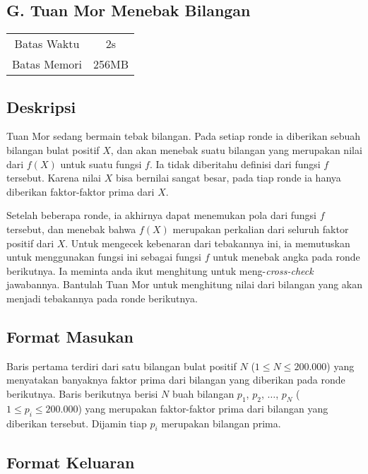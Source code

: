 \documentclass{article}
\begin{document}
\begin{center}
    \section*{G. Tuan Mor Menebak Bilangan}

    \begin{tabular}{ | c c | }
        \hline
        Batas Waktu  & 2s \\ 
        Batas Memori & 256MB \\ 
        \hline
    \end{tabular}
\end{center}

\subsection*{Deskripsi}

Tuan Mor sedang bermain tebak bilangan. Pada setiap ronde ia diberikan sebuah bilangan bulat positif $X$, dan akan menebak suatu bilangan yang merupakan nilai dari $f(X)$ untuk suatu fungsi $f$. Ia tidak diberitahu definisi dari fungsi $f$ tersebut. Karena nilai $X$ bisa bernilai sangat besar, pada tiap ronde ia hanya diberikan faktor-faktor prima dari $X$. 

Setelah beberapa ronde, ia akhirnya dapat menemukan pola dari fungsi $f$ tersebut, dan menebak bahwa $f(X)$ merupakan perkalian dari seluruh faktor positif dari $X$. Untuk mengecek kebenaran dari tebakannya ini, ia memutuskan untuk menggunakan fungsi ini sebagai fungsi $f$ untuk menebak angka pada ronde berikutnya. Ia meminta anda ikut menghitung untuk meng-\textit{cross-check} jawabannya. Bantulah Tuan Mor untuk menghitung nilai dari bilangan yang akan menjadi tebakannya pada ronde berikutnya.

\subsection*{Format Masukan}

Baris pertama terdiri dari satu bilangan bulat positif $N$ ($1 \leq N \leq 200.000$) yang menyatakan banyaknya faktor prima dari bilangan yang diberikan pada ronde berikutnya.
Baris berikutnya berisi $N$ buah bilangan $p_1$, $p_2$, $\dots$, $p_N$ ($1 \leq p_i \leq 200.000$) yang merupakan faktor-faktor prima dari bilangan yang diberikan tersebut. Dijamin tiap $p_i$ merupakan bilangan prima.

\subsection*{Format Keluaran}
\end{document}
